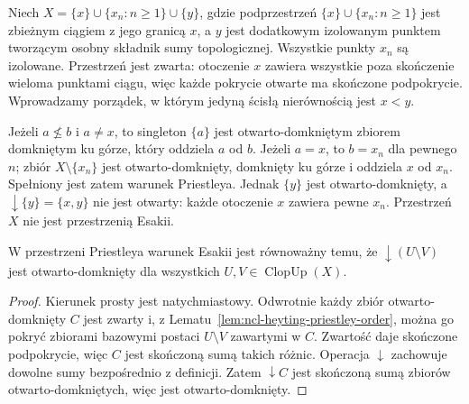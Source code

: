 \begin{przyklad}
\label{ex:ncl-heyting-priestley-not-esakia}
Niech $X=\{x\}\cup\{x_n:n\geq1\}\cup\{y\}$,
gdzie podprzestrzeń $\{x\}\cup\{x_n:n\geq1\}$
jest zbieżnym ciągiem z jego granicą $x$,
a $y$ jest dodatkowym izolowanym punktem
tworzącym osobny składnik sumy topologicznej.
Wszystkie punkty $x_n$ są izolowane.
Przestrzeń jest zwarta: otoczenie $x$ zawiera
wszystkie poza skończenie wieloma punktami ciągu,
więc każde pokrycie otwarte ma skończone podpokrycie.
Wprowadzamy porządek, w którym jedyną ścisłą
nierównością jest $x<y$.

Jeżeli $a\not\leq b$ i $a\ne x$, to singleton
$\{a\}$ jest otwarto-domkniętym zbiorem domkniętym
ku górze, który oddziela $a$ od $b$.
Jeżeli $a=x$, to $b=x_n$ dla pewnego $n$;
zbiór $X\setminus\{x_n\}$ jest otwarto-domknięty,
domknięty ku górze i oddziela $x$ od $x_n$.
Spełniony jest zatem warunek Priestleya.
Jednak $\{y\}$ jest otwarto-domknięty, a
$\downarrow\{y\}=\{x,y\}$ nie jest otwarty:
każde otoczenie $x$ zawiera pewne $x_n$.
Przestrzeń $X$ nie jest przestrzenią Esakii.
\end{przyklad}

\begin{lemat}
\label{lem:ncl-heyting-esakia-differences}
W przestrzeni Priestleya warunek Esakii jest
równoważny temu, że $\downarrow(U\setminus V)$
jest otwarto-domknięty dla wszystkich
$U,V\in\operatorname{ClopUp}(X)$.
\end{lemat}
\begin{proof}
Kierunek prosty jest natychmiastowy.
Odwrotnie każdy zbiór otwarto-domknięty $C$
jest zwarty i, z Lematu~\ref{lem:ncl-heyting-priestley-order},
można go pokryć zbiorami bazowymi postaci
$U\setminus V$ zawartymi w $C$.
Zwartość daje skończone podpokrycie, więc
$C$ jest skończoną sumą takich różnic.
Operacja $\downarrow$ zachowuje dowolne sumy
bezpośrednio z definicji.
Zatem $\downarrow C$ jest skończoną sumą
zbiorów otwarto-domkniętych, więc jest
otwarto-domknięty.
\end{proof}


